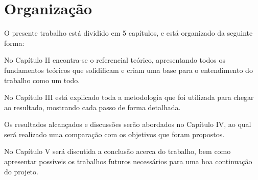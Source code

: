 \section{Organização}
O presente trabalho está dividido em 5 capítulos, e está organizado da seguinte forma:

No Capítulo II encontra-se o referencial teórico, apresentando todos os fundamentos teóricos que solidificam e criam uma base para o entendimento do trabalho como um todo.

No Capítulo III está explicado toda a metodologia que foi utilizada para chegar ao resultado, mostrando cada passo de forma detalhada.

Os resultados alcançados e discussões serão abordados no Capítulo IV, ao qual será realizado uma comparação com os objetivos que foram propostos.

No Capítulo V será discutida a conclusão acerca do trabalho, bem como apresentar possíveis os trabalhos futuros necessários para uma boa continuação do projeto.
    













